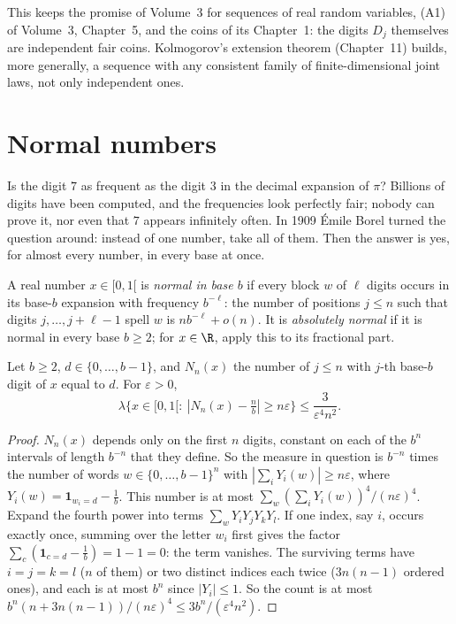 This keeps the promise of Volume~3 for sequences of real random variables, (A1) of Volume~3, Chapter~5, and the coins of its Chapter~1: the
digits $D_j$ themselves are independent fair coins. Kolmogorov's extension theorem (Chapter~11) builds, more generally, a sequence with any
consistent family of finite-dimensional joint laws, not only independent ones.

\section{Normal numbers}

Is the digit $7$ as frequent as the digit $3$ in the decimal expansion of $\pi$? Billions of digits have been computed, and the
frequencies look perfectly fair; nobody can prove it, nor even that $7$ appears infinitely often. In 1909 \'Emile Borel turned the
question around: instead of one number, take all of them. Then the answer is yes, for almost every number, in every base at once.

A real number $x\in[0,1[$ is \emph{normal in base $b$} if every block $w$ of $\ell$ digits occurs in its base-$b$ expansion with frequency $b^{-\ell}$: the number of positions $j\le n$
such that digits $j,\dots,j+\ell-1$ spell $w$ is $nb^{-\ell}+o(n)$. It is \emph{absolutely normal} if it is normal in every base $b\ge2$; for $x\in\R$, apply this to its fractional part.

\begin{lemma}\label{lem:fourth}
Let $b\ge2$, $d\in\{0,\dots,b-1\}$, and $N_n(x)$ the number of $j\le n$ with $j$-th base-$b$ digit of $x$ equal to $d$. For $\varepsilon>0$,
\[\lambda\bigl\{x\in[0,1[:\ |N_n(x)-\tfrac nb|\ge n\varepsilon\bigr\}\le\frac3{\varepsilon^4n^2}.\]
\end{lemma}
\begin{proof}
$N_n(x)$ depends only on the first $n$ digits, constant on each of the $b^n$ intervals of length $b^{-n}$ that they define. So the measure in question is $b^{-n}$ times the number
of words $w\in\{0,\dots,b-1\}^n$ with $|\sum_iY_i(w)|\ge n\varepsilon$, where $Y_i(w)=\mathbf 1_{w_i=d}-\frac1b$. This number is at most $\sum_w(\sum_iY_i(w))^4/(n\varepsilon)^4$. Expand the fourth power into terms
$\sum_wY_iY_jY_kY_l$. If one index, say $i$, occurs exactly once, summing over the letter $w_i$ first gives the factor $\sum_{c}(\mathbf 1_{c=d}-\frac1b)=1-1=0$: the term vanishes. The surviving
terms have $i=j=k=l$ ($n$ of them) or two distinct indices each twice ($3n(n-1)$ ordered ones), and each is at most $b^n$ since $|Y_i|\le1$. So the count is at most
$b^n(n+3n(n-1))/(n\varepsilon)^4\le3b^n/(\varepsilon^4n^2)$.
\end{proof}

